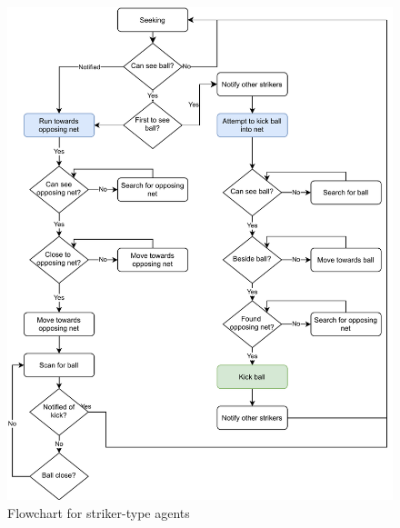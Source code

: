 \documentclass[conference]{IEEEtran}
\begin{document}
\begin{figure}[]
	\centering
	\includegraphics[scale=0.5]{fig/striker-flowchart.pdf}
	\caption{Flowchart for striker-type agents}
	\label{flowchart-striker}
\end{figure}
\end{document}
